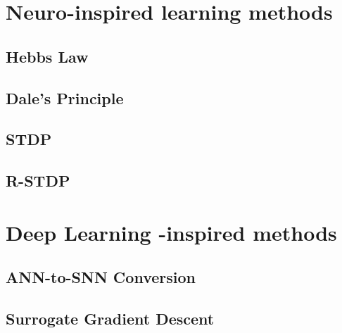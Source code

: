 \section{Neuro-inspired learning methods}
\subsection{Hebbs Law}
\subsection{Dale's Principle}
\subsection{STDP}
\subsection{R-STDP}

\section{Deep Learning -inspired methods}
\subsection{ANN-to-SNN Conversion}
\subsection{Surrogate Gradient Descent}
